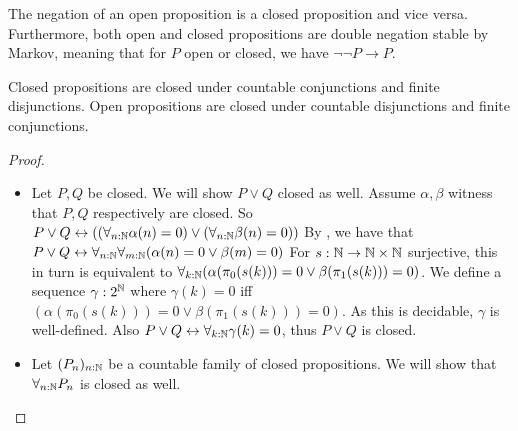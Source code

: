 \begin{remark}\label{rmkOpenClosedNegation}
  The negation of an open proposition is a closed proposition and vice versa. 
  Furthermore, both open and closed propositions are double negation stable by Markov, 
  meaning that for $P$ open or closed, we have $\neg \neg P \to P$.
\end{remark}



\begin{lemma}\label{lemOpenClosedDisjunctionConjunction}
  Closed propositions are closed under countable conjunctions %
  and finite disjunctions.
  Open propositions are closed under countable disjunctions %
  and finite conjunctions. 
\end{lemma}
\begin{proof}
  \begin{itemize}
    \item Let $P,Q$ be closed. We will show $P\vee Q$ closed as well. 
      Assume $\alpha,\beta$ witness that $P,Q$ respectively are closed. 
      So $P\vee Q \leftrightarrow 
      ((\forall_{n:\mathbb{N}} \alpha(n) = 0) 
      \vee (\forall_{n:\mathbb{N}} \beta(n) = 0))$
      By , we have that 
      $P\vee Q \leftrightarrow 
      \forall_{n:\mathbb{N}}  \forall_{m:\mathbb{N}}  (\alpha(n) = 0 \vee \beta(m) = 0)$
      For $s:\mathbb{N} \to \mathbb{N} \times \mathbb{N}$ surjective, 
      this in turn is equivalent to 
      $\forall_{k:\mathbb{N}}  (\alpha(\pi_0(s(k))) = 0 \vee \beta(\pi_1(s(k))) = 0)$. 
      We define a sequence $\gamma:2^{\mathbb{N}}$ where 
      $\gamma(k) = 0$ iff $(\alpha(\pi_0(s(k))) = 0 \vee \beta(\pi_1(s(k))) = 0)$. 
      As this is decidable, $\gamma$ is well-defined.
      Also
      $P\vee Q \leftrightarrow \forall_{k:\mathbb{N}} \gamma(k) = 0$, 
      thus $P\vee Q$ is closed. 
    \item Let $(P_n)_{n:\mathbb{N}}$ be a countable family of closed propositions. 
      We will show that 
      $\forall_{n:\mathbb{N}} P_n$ is closed as well. 

\end{itemize}
\end{proof}
